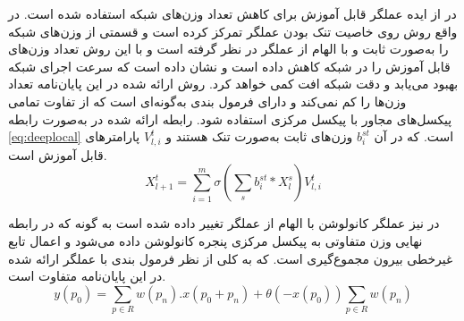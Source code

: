 در
\cite{juefei2017local} 
از ایده عملگر  قابل آموزش برای کاهش تعداد وزن‌های شبکه استفاده شده است. در واقع روش
\cite{juefei2017local} 
روی خاصیت تنک بودن
 عملگر  تمرکز کرده است و قسمتی از وزن‌های شبکه را به‌صورت ثابت و با الهام از عملگر  در نظر گرفته است و با این روش تعداد وزن‌های قابل آموزش را در شبکه کاهش داده است و نشان داده است که سرعت اجرای شبکه بهبود می‌یابد و دقت شبکه افت کمی خواهد کرد. روش ارائه شده در این پایان‌نامه تعداد وزن‌ها را کم نمی‌کند و دارای فرمول بندی به‌گونه‌ای است که از تفاوت تمامی پیکسل‌های مجاور با پیکسل مرکزی استفاده شود.
رابطه ارائه شده در 
\cite{juefei2017local} 
 به‌صورت رابطه
\ref{eq:deeplocal}
  است. که در آن 
  $b_i^{st}$
  وزن‌های ثابت به‌صورت تنک هستند و 
  $V_{l,i}^t$
  پارامترهای قابل آموزش است.
\begin{equation}\label{eq:deeplocal}
	X_{l+1}^t=\sum_{i=1}^{m}{\sigma(\sum_{s}{b_i^{st}*X_l^s })V_{l,i}^t}
\end{equation}

در 
\cite{yu2020searching}
نیز عملگر کانولوشن با الهام از عملگر  تغییر داده شده است به گونه که در رابطه نهایی وزن متفاوتی به پیکسل مرکزی پنجره کانولوشن داده می‌شود و اعمال تابع غیرخطی بیرون مجموع‌گیری است. که به کلی از نظر فرمول بندی با عملگر ارائه شده در این پایان‌نامه متفاوت است. 
\begin{equation}\label{eq:central-dif4}
	y(p_0) = \sum_{p \in R} {w(p_n).x(p_0+p_n)} +
	\theta(-x(p_0))\sum_{p \in R}{w(p_n)}
\end{equation}




 

  




